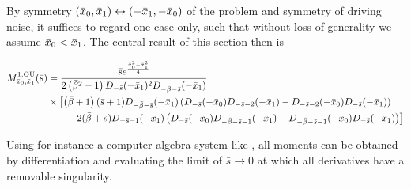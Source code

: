 \documentclass[%
 reprint,
superscriptaddress,
nofootinbib,
 amsmath,amssymb,
 aps,
prx,
]{revtex4-2}
\begin{document}
By symmetry $(\bar{x}_0, \bar{x}_1) \leftrightarrow (-\bar{x}_1,-\bar{x}_0)$ of the problem and symmetry of driving noise, it suffices to regard one case only, such that without loss of generality we assume $\bar{x}_0 < \bar{x}_1$.
The central result of this section then is
\begin{widetext} 
\begin{align}
M^{1, {\rm OU}}_{\bar{x}_0, \bar{x}_1} (\bar{s}) &
=  \frac{\bar{s}  e^{\frac{{\bar{x}_0}^2-{\bar{x}_1}^2}{4}}}{2 \left({\bar{\beta}} ^2-1\right) D_{-\bar{s} }(-\bar{x}_1){}^2 D_{-{\bar{\beta}} -\bar{s} }(-\bar{x}_1)}
\nonumber\\
&\times \left[ \left({\bar{\beta}} +1\right)(\bar{s} + 1)D_{-{\bar{\beta}}-\bar{s}}(-\bar{x}_1) \left(D_{-\bar{s}}(-\bar{x}_0)D_{-\bar{s}-2}(-\bar{x}_1)-D_{-\bar{s}-2}(-\bar{x}_0)D_{-\bar{s}}(-\bar{x}_1) \right)\right. 
\nonumber\\
 & \qquad \left. -2 ({\bar{\beta}} +\bar{s} ) D_{-\bar{s} -1}(-\bar{x}_1) \left(D_{-\bar{s} }(-\bar{x}_0) D_{-{\bar{\beta}} -\bar{s} -1}(-\bar{x}_1)- D_{-{\bar{\beta}} -\bar{s} -1}(-\bar{x}_0)D_{-\bar{s} }(-\bar{x}_1)\right)\right]
\label{eq:OUOU_M1}
\end{align}
\end{widetext}
Using for instance a computer algebra system like \cite{Mathematica}, all moments can be obtained by differentiation and evaluating the limit of $\bar{s} \to 0$ at which all derivatives have a removable singularity.
\end{document}
